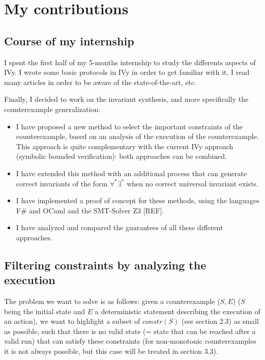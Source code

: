 \documentclass[11pt,a4paper,oldfontcommands,openany]{memoir}
\begin{document}
\chapter{My contributions}

    \section{Course of my internship}

    I spent the first half of my 5-months internship to study the differents aspects of IVy. I wrote some basic protocols in IVy in order to get
    familiar with it, I read many articles in order to be aware of the state-of-the-art, etc.

    Finally, I decided to work on the invariant synthesis, and more specifically the counterexample generalization:
    \begin{itemize}
        \item I have proposed a new method to select the important constraints of the counterexample, based on an analysis of the execution of the counterexample.
        This approach is quite complementary with the current IVy approach (symbolic bounded verification): both approaches can be combined. 
        \item I have extended this method with an additional process that can generate correct invariants of the form \(\forall^*\exists^*\)
        when no correct universal invariant exists.
        \item I have implemented a proof of concept for these methods, using the languages F\# and OCaml and the SMT-Solver Z3 [REF].        
        \item I have analyzed and compared the guarantees of all these different approaches.
    \end{itemize}

    \section{Filtering constraints by analyzing the execution}

    The problem we want to solve is as follows: given a counterexample (\(S,E\)) (\(S\) being the initial state and \(E\) a deterministic statement describing the execution of an action),
    we want to highlight a subset of \(constr(S)\) (see section 2.3) as small as possible, such that there is no valid state (= state that can be reached after a valid run) that can satisfy these constraints
    (for non-monotonic counterexamples it is not always possible, but this case will be treated in section 3.3).
\end{document}
